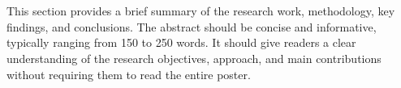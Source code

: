 \section*{}

This section provides a brief summary of the research work, methodology, key findings, and conclusions. The abstract should be concise and informative, typically ranging from 150 to 250 words. It should give readers a clear understanding of the research objectives, approach, and main contributions without requiring them to read the entire poster.
